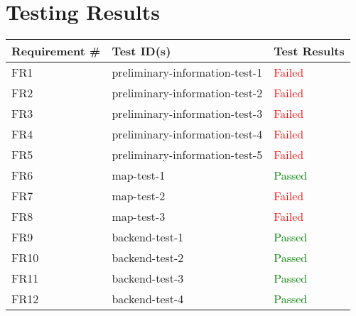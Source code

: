 \documentclass[12pt, titlepage]{article}
\begin{document}
\section{Testing Results}
  \begin{table}[h!]
	
	\begin{tabular}{|p{3.5cm}|p{6.5cm}|p{4.5cm}|}

	\hline
	\textbf{Requirement \#} & \textbf{Test ID(s)}   &\textbf{Test Results}  \\ \hline
	FR1 & preliminary-information-test-1 & \textcolor{red}{Failed} \\ \hline
	FR2 & preliminary-information-test-2 & \textcolor{red}{Failed}   \\ \hline
	FR3 & preliminary-information-test-3 & \textcolor{red}{Failed} \\ \hline
	FR4 & preliminary-information-test-4 & \textcolor{red}{Failed} \\ \hline
	FR5 & preliminary-information-test-5 & \textcolor{red}{Failed}  \\ \hline
	FR6 & map-test-1 & \textcolor{green}{Passed} \\ \hline
	FR7 & map-test-2 & \textcolor{red}{Failed}  \\ \hline
	FR8 & map-test-3 & \textcolor{red}{Failed}  \\ \hline
	FR9 & backend-test-1 & \textcolor{green}{Passed}\\ \hline
	FR10 & backend-test-2 & \textcolor{green}{Passed} \\ \hline
	FR11 & backend-test-3 & \textcolor{green}{Passed}\\ \hline
	FR12 & backend-test-4 & \textcolor{green}{Passed}\\ \hline
	
	\end{tabular}
	
  \end{table}
\end{document}
